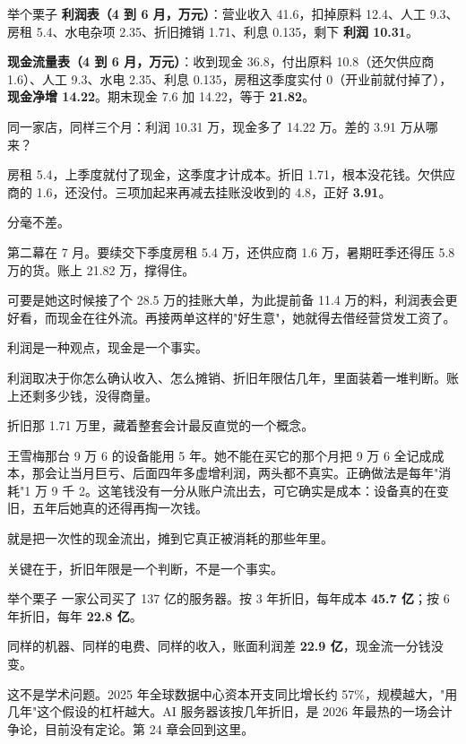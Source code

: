 \begin{egbox}{举个栗子}
\textbf{利润表（4 到 6 月，万元）}：营业收入 41.6，扣掉原料 12.4、人工 9.3、房租 5.4、水电杂项 2.35、折旧摊销 1.71、利息 0.135，剩下 \textbf{利润 10.31}。

\textbf{现金流量表（4 到 6 月，万元）}：收到现金 36.8，付出原料 10.8（还欠供应商 1.6）、人工 9.3、水电 2.35、利息 0.135，房租这季度实付 0（开业前就付掉了），\textbf{现金净增 14.22}。期末现金 7.6 加 14.22，等于 \textbf{21.82}。

同一家店，同样三个月：利润 10.31 万，现金多了 14.22 万。差的 3.91 万从哪来？

房租 5.4，上季度就付了现金，这季度才计成本。折旧 1.71，根本没花钱。欠供应商的 1.6，还没付。三项加起来再减去挂账没收到的 4.8，正好 \textbf{3.91}。

分毫不差。

\end{egbox}

第二幕在 7 月。要续交下季度房租 5.4 万，还供应商 1.6 万，暑期旺季还得压 5.8 万的货。账上 21.82 万，撑得住。

可要是她这时候接了个 28.5 万的挂账大单，为此提前备 11.4 万的料，利润表会更好看，而现金在往外流。再接两单这样的"好生意"，她就得去借经营贷发工资了。

利润是一种观点，现金是一个事实。

利润取决于你怎么确认收入、怎么摊销、折旧年限估几年，里面装着一堆判断。账上还剩多少钱，没得商量。


折旧那 1.71 万里，藏着整套会计最反直觉的一个概念。

王雪梅那台 9 万 6 的设备能用 5 年。她不能在买它的那个月把 9 万 6 全记成成本，那会让当月巨亏、后面四年多虚增利润，两头都不真实。正确做法是每年"消耗"1 万 9 千 2。这笔钱没有一分从账户流出去，可它确实是成本：设备真的在变旧，五年后她真的还得再掏一次钱。

就是把一次性的现金流出，摊到它真正被消耗的那些年里。

关键在于，折旧年限是一个判断，不是一个事实。

\begin{egbox}{举个栗子}
一家公司买了 137 亿的服务器。按 3 年折旧，每年成本 \textbf{45.7 亿}；按 6 年折旧，每年 \textbf{22.8 亿}。

同样的机器、同样的电费、同样的收入，账面利润差 \textbf{22.9 亿}，现金流一分钱没变。

这不是学术问题。2025 年全球数据中心资本开支同比增长约 57\%，规模越大，"用几年"这个假设的杠杆越大。AI 服务器该按几年折旧，是 2026 年最热的一场会计争论，目前没有定论。第 24 章会回到这里。

\end{egbox}

